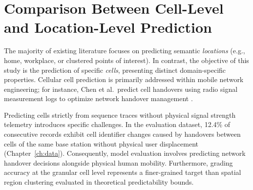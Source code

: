 \section{Comparison Between Cell-Level and Location-Level Prediction}

The majority of existing literature focuses on predicting semantic \emph{locations} (e.g., home, workplace, or clustered points of interest). In contrast, the objective of this study is the prediction of specific \emph{cells}, presenting distinct domain-specific properties. Cellular cell prediction is primarily addressed within mobile network engineering; for instance, Chen et al.\ predict cell handovers using radio signal measurement logs to optimize network handover management \textbf{\cite{chen2013nextcell}}.

Predicting cells strictly from sequence traces without physical signal strength telemetry introduces specific challenges. In the evaluation dataset, 12.4\% of consecutive records exhibit cell identifier changes caused by handovers between cells of the same base station without physical user displacement (Chapter~\ref{ch:data}). Consequently, model evaluation involves predicting network handover decisions alongside physical human mobility. Furthermore, grading accuracy at the granular cell level represents a finer-grained target than spatial region clustering evaluated in theoretical predictability bounds.



